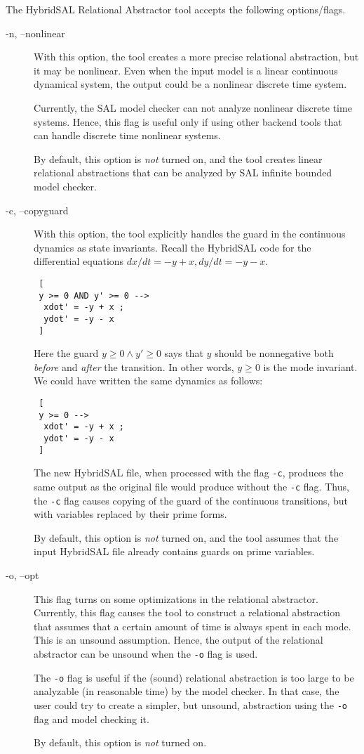 \documentclass{article}
\begin{document}
The HybridSAL Relational Abstractor tool accepts the following options/flags.
\begin{description}
\item[-n, --nonlinear]
 With this option, the tool creates a more precise relational abstraction,
 but it may be nonlinear.  Even when the input model is a linear
 continuous dynamical system, the output could be a nonlinear discrete
 time system.
 
 Currently, the SAL model checker can not analyze nonlinear discrete time
 systems.  Hence, this flag is useful only if using other backend tools
 that can handle discrete time nonlinear systems.

 By default, this option is {\em{not}} turned on, and the tool
 creates linear relational abstractions that can be analyzed by SAL
 infinite bounded model checker.

\item[-c, --copyguard]
 With this option, the tool explicitly handles the guard in the 
 continuous dynamics as state invariants.
 Recall the HybridSAL code for the differential equations
 $dx/dt = -y+x, dy/dt = -y-x$.
 \begin{tt}
 \begin{verbatim}
 [
 y >= 0 AND y' >= 0 --> 
  xdot' = -y + x ;
  ydot' = -y - x
 ]
 \end{verbatim}
 \end{tt}
 Here the guard $y \geq 0 \wedge y'\geq 0$ says that $y$ should be
 nonnegative both {\em{before}} and {\em{after}} the transition.
 In other words, $y\geq 0$ is the mode invariant.
 We could have written the same dynamics as follows:
 \begin{tt}
 \begin{verbatim}
 [
 y >= 0 --> 
  xdot' = -y + x ;
  ydot' = -y - x
 ]
 \end{verbatim}
 \end{tt}
 The new HybridSAL file, when processed with the flag {\tt{-c}},
 produces the same output as the original file would produce 
 without the {\tt{-c}} flag.
 Thus, the {\tt{-c}} flag causes copying of the guard 
 of the continuous transitions, but
 with variables replaced by their prime forms.

 By default, this option is {\em{not}} turned on, and the tool
 assumes that the input HybridSAL file already 
 contains guards on prime variables.

\item[-o, --opt]
 This flag turns on some optimizations in the relational
 abstractor.
 Currently, this flag causes the tool to construct a 
 relational abstraction that assumes that a certain amount
 of time is always spent in each mode.  This is an
 unsound assumption.  Hence, the output of the relational
 abstractor can be unsound when the {\tt{-o}} flag is used.
 
 The {\tt{-o}} flag is useful if the (sound) relational abstraction
 is too large to be analyzable (in reasonable time) by the model checker.
 In that case, the user could try to create a simpler, but unsound,
 abstraction using the {\tt{-o}} flag and model checking it.
 
 By default, this option is {\em{not}} turned on.
\end{description}
\end{document}
